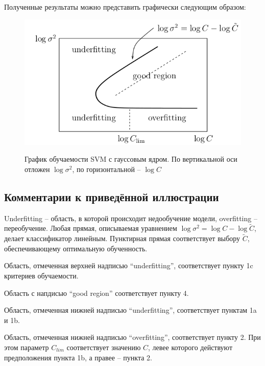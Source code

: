 \documentclass[14pt,a4paper,article]{ncc}
\numberwithin{equation}{subsection}
\begin{document}
Полученные результаты можно представить графически следующим образом:
 \begin{figure}[H]
	\begin{center}
		\includegraphics[scale=0.75]{learn_asympt}
		\label{pic:learn_asympt}
		\caption{График обучаемости SVM с гауссовым ядром. По вертикальной оси отложен $\log \sigma^2$, по горизонтальной -- 
		$\log C$}
		\end{center}
	\end{figure}

\subsection{Комментарии к приведённой иллюстрации}
Underfitting -- область, в которой происходит недообучение модели, overfitting -- переобучение. Любая прямая, описываемая уравнением $\log \sigma^2 = \log C - \log \tilde{C}$, делает классификатор линейным. Пунктирная прямая соответствует выбору $\tilde{C}$, обеспечивающему оптимальную обученность.

Область, отмеченная верхней надписью ``underfitting'', соответствует пункту 1c критериев обучаемости.

Область с напдисью ``good region'' соответствует пункту 4.

Область, отмеченная нижней надписью ``underfitting'', соответствует пунктам 1a и 1b.

Область, отмеченная нижней надписью ``overfitting'', соответствует пункту 2. При этом параметр $C_{lim}$ соответствует значению $C$, левее которого действуют предположения пункта 1b, а правее -- пункта 2.
\end{document}
